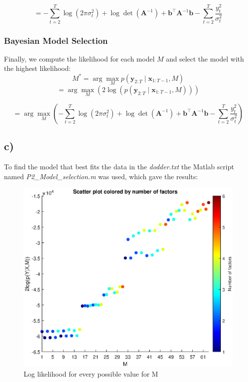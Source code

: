 \documentclass{article}
\begin{document}
\[
= 
-\sum_{t=2}^T \log(2\pi \sigma_t^2)
+ \log \det( \boldsymbol{A}^{-1}) 
+ \boldsymbol{b}^\top \boldsymbol{A}^{-1} \boldsymbol{b} 
- \sum_{t=2}^T \frac{y_t^2}{\sigma_t^2} 
\]

\subsubsection*{Bayesian Model Selection}

Finally, we compute the likelihood for each model $M$ and select the model with the highest likelihood:
\[
M^* = \arg\max_M p(\boldsymbol{y}_{2:T} \mid \boldsymbol{x}_{1:T-1}, M)
\]
\[
= \arg\max_M  \left( 2 \log ( p(\boldsymbol{y}_{2:T} \mid \boldsymbol{x}_{1:T-1}, M)) \right)
\]

\[
= \arg\max_M \left( 
-\sum_{t=2}^T \log(2\pi \sigma_t^2)
+ \log \det( \boldsymbol{A}^{-1}) 
+ \boldsymbol{b}^\top \boldsymbol{A}^{-1} \boldsymbol{b} 
- \sum_{t=2}^T \frac{y_t^2}{\sigma_t^2} 
\right)
\]

\subsection*{c)}

To find the model that best fits the data in the \textit{dodder.txt} the Matlab script named \textit{P2_Model_selection.m} was used, which gave the results:


\begin{figure}[H]
    \centering
    \includegraphics[width=\textwidth]{model_selection.eps}     
    \caption{Log likelihood for every possible value for M}
\end{figure}
\end{document}
